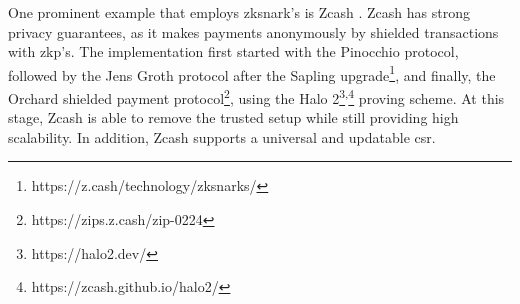 One prominent example that employs \acrshort{zksnark}'s is Zcash \cite{bensassonZerocashDecentralizedAnonymous2014}. Zcash has strong privacy guarantees, as it makes payments anonymously by shielded transactions with \acrshort{zkp}'s. The implementation first started with the Pinocchio \cite{parnoPinocchioNearlyPractical} protocol, followed by the Jens Groth \cite{grothSizePairingBasedNoninteractive2016} protocol after the Sapling upgrade\footnote{https://z.cash/technology/zksnarks/}, and finally, the Orchard shielded payment protocol\footnote{https://zips.z.cash/zip-0224}, using the Halo 2{\footnote{https://halo2.dev/}\textsuperscript{,}\footnote{https://zcash.github.io/halo2/}} proving scheme. At this stage, Zcash is able to remove the trusted setup while still providing high scalability. In addition, Zcash supports a universal and updatable \acrshort{csr}.




